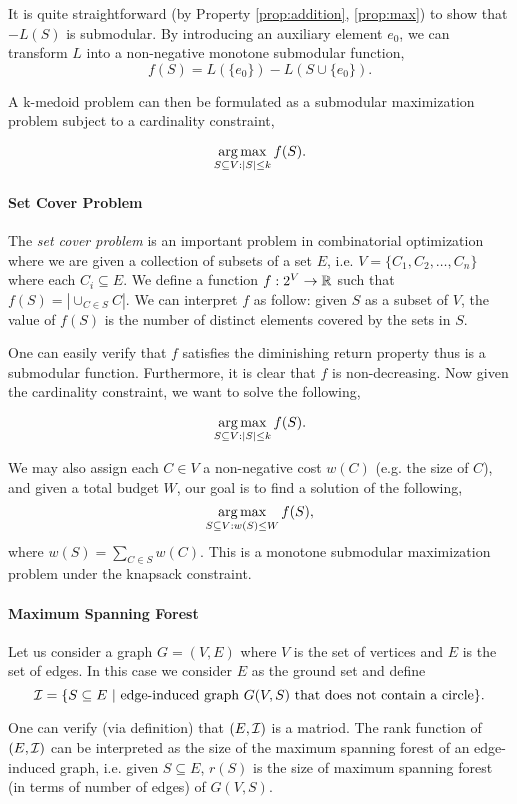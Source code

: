 It is quite straightforward (by Property \ref{prop:addition}, \ref{prop:max}) to show that $-L(S)$ is submodular. By introducing an auxiliary element $e_0$, we can transform $L$ into a non-negative monotone submodular function,
$$f(S) = L(\{e_0\}) - L(S \cup \{e_0\}).$$ 

A k-medoid problem can then be formulated as a submodular maximization problem subject to a cardinality constraint,

$$\operatorname*{arg\,max}_{S\subseteq V: |S| \leq k} f(S).$$


\paragraph{Set Cover Problem}
The \emph{set cover problem} is an important problem in combinatorial optimization where we are given a collection of subsets of a set $E$, i.e. $V = \{C_1, C_2, \ldots, C_n\}$ where each $C_i \subseteq E$. We define a function $f:2^V \rightarrow \mathbb{R}$ such that $f(S) = |\cup_{C\in S} C|$. We can interpret $f$ as follow: given $S$ as a subset of $V$, the value of $f(S)$ is the number of distinct elements covered by the sets in $S$.

One can easily verify that $f$ satisfies the diminishing return property thus is a submodular function. Furthermore, it is clear that $f$ is non-decreasing.  Now given the cardinality constraint, we want to solve the following,

$$\operatorname*{arg\,max}_{S\subseteq V: |S|\leq k} f(S).$$

We may also assign each $C\in V$ a non-negative cost $w(C)$ (e.g. the size of $C$), and given a total budget $W$, our goal is to find a solution of the following,
$$\operatorname*{arg\,max}_{S\subseteq V: w(S) \leq W} f(S),$$
where $w(S) = \sum_{C\in S} w(C)$. This is a monotone submodular maximization problem under the knapsack constraint.



\paragraph{Maximum Spanning Forest}
Let us consider a graph $G = (V, E)$ where $V$ is the set of vertices and $E$ is the set of edges. In this case we consider $E$ as the ground set and define 
$$\mathcal{I} = \{S\subseteq E ~|~\text{edge-induced graph}~G(V, S)~\text{that does not contain a circle}\}.$$

One can verify (via definition) that $(E, \mathcal{I})$ is a matriod. The rank function of $(E, \mathcal{I})$ can be interpreted as the size of the maximum spanning forest of an edge-induced graph, i.e. given $S\subseteq E$, $r(S)$ is the size of maximum spanning forest (in terms of number of edges) of $G(V, S)$. 




